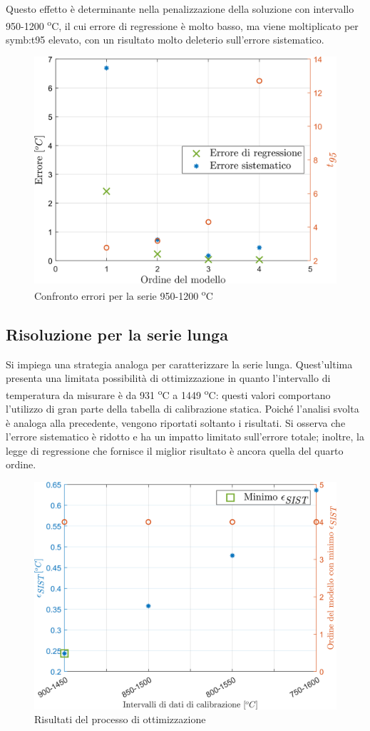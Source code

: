 Questo effetto è determinante nella penalizzazione della soluzione con intervallo 950-1200 \textsuperscript{o}C, il cui errore di regressione è molto basso, ma viene moltiplicato per \gls{symb:t95} elevato, con un risultato molto deleterio sull'errore sistematico. 

\begin{figure} [H]
	\centering
	\includegraphics[width=0.5\linewidth]{"../sperimentazione nei propulsori/err_sist_short_test"}
	\caption{Confronto errori per la serie 950-1200 \textsuperscript{o}C}
	\label{fig:errsistshorttest}
\end{figure}

\subsection{Risoluzione per la serie lunga}
Si impiega una strategia analoga per caratterizzare la serie lunga. Quest'ultima presenta una limitata possibilità di ottimizzazione in quanto l'intervallo di temperatura da misurare è da 931 \textsuperscript{o}C a 1449 \textsuperscript{o}C:  questi valori comportano l'utilizzo di gran parte della tabella di calibrazione statica. Poiché l'analisi svolta è analoga alla precedente, vengono riportati soltanto i risultati. Si osserva che l'errore sistematico è ridotto e ha un impatto limitato sull'errore totale; inoltre, la legge di regressione che fornisce il miglior risultato è ancora quella del quarto ordine. 

\begin{figure} [H]
	\centering
	\includegraphics[width=0.6\linewidth]{"../sperimentazione nei propulsori/err_sist_long"}
	\caption{Risultati del processo di ottimizzazione}
	\label{fig:errsistlong}
\end{figure}

